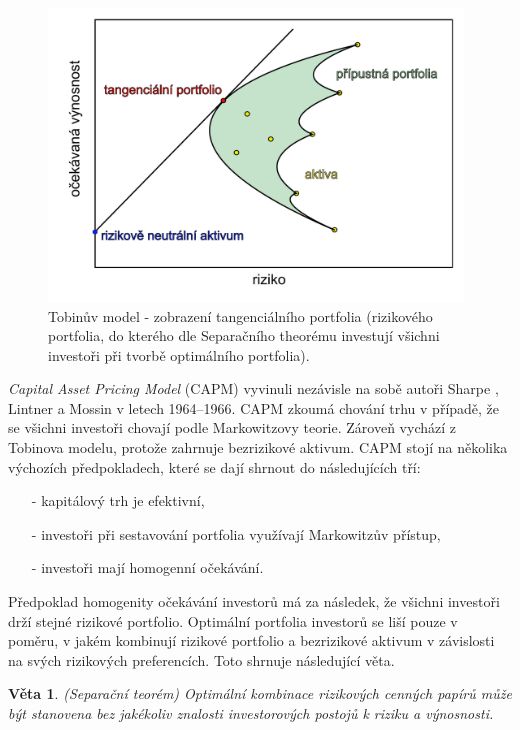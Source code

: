 \documentclass[a4paper,12pt]{report}
\newtheorem{veta}{Věta}
\theoremstyle{definition} \newtheorem{definice}[veta]{Definice}
\theoremstyle{remark}
\begin{document}
\begin{figure}[!htbp]
  \centering 
  \includegraphics[width=11cm]{IMG/graf_1.pdf}
  \caption{Tobinův model - zobrazení tangenciálního portfolia (rizikového portfolia, do kterého dle Separačního theorému investují všichni investoři při tvorbě optimálního portfolia).}
  \label{obr_Tobin_2}
\end{figure}

\textit{Capital Asset Pricing Model} (CAPM) vyvinuli nezávisle na sobě autoři Sharpe \cite{sharpe1964}, Lintner \cite{lintner1965} a Mossin \cite{mossin1966} v letech 1964--1966. CAPM zkoumá chování trhu v případě, že se všichni investoři chovají podle Markowitzovy teorie.
Zároveň vychází z Tobinova modelu, protože zahrnuje bezrizikové aktivum.
CAPM stojí na několika výchozích předpokladech, které se dají shrnout do následujících tří:
\begin{itemize}
\item[-] kapitálový trh je efektivní,
\item[-] investoři při sestavování portfolia využívají Markowitzův přístup,
\item[-] investoři mají homogenní očekávání.
\end{itemize}
Předpoklad homogenity očekávání investorů má za následek, že všichni investoři drží stejné rizikové portfolio.
Optimální portfolia investorů se liší pouze v poměru, v jakém kombinují rizikové portfolio a bezrizikové aktivum v závislosti na svých rizikových preferencích.
Toto shrnuje následující věta.

\begin{veta}(Separační teorém)
Optimální kombinace rizikových cenných papírů může být stanovena bez jakékoliv znalosti investorových postojů k riziku a výnosnosti.
\end{veta}
\end{document}
